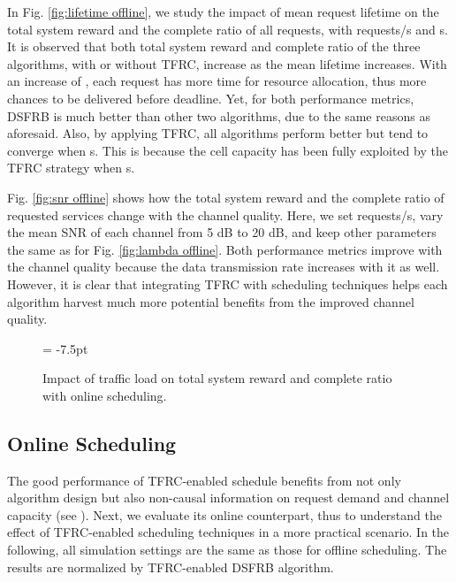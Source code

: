 \documentclass[journal,letterpaper,12pt,oneside,onecolumn,draftclsnofoot]{IEEEtran}
\begin{document}
In Fig. \ref{fig:lifetime offline}, we study the impact of mean request lifetime on the total system reward and the complete ratio of all requests, with  requests/s and  s. It is observed that both total system reward and complete ratio of the three algorithms, with or without TFRC, increase as the mean lifetime  increases. With an increase of , each request has more time for resource allocation, thus more chances to be delivered before deadline.
Yet, for both performance metrics, DSFRB is  much better than other two algorithms, due to the same reasons as aforesaid.
Also, by applying TFRC, all  algorithms perform better but tend to converge when  s. This is because the cell capacity has been fully exploited by the TFRC strategy when  s.





Fig. \ref{fig:snr offline} shows how the total system reward and the complete ratio of requested services change with the channel quality. Here, we set  requests/s, vary the mean SNR of each channel from 5 dB to 20 dB, and keep other parameters the same as for Fig. \ref{fig:lambda offline}. Both performance metrics improve with the channel quality because the data transmission rate increases with it as well. However, it is clear that integrating TFRC with scheduling techniques helps each algorithm harvest much more potential benefits from the improved channel quality.

\vspace{-0.25cm}
\begin{figure*}[htp]
\subfigcapskip = -7.5pt
\centering
{}
\vspace{-0.3cm}
\caption{Impact of traffic load on total system reward and complete ratio with online scheduling.}
\label{fig:lambda online}
\vspace{-0.5cm}
\end{figure*}


\subsection{Online Scheduling}

The good performance of TFRC-enabled schedule benefits from not only algorithm design but also non-causal information on request demand and channel capacity (see \cite{Shan_TWC_submitted}). Next, we evaluate its online counterpart, thus to understand the effect of TFRC-enabled scheduling techniques in a more practical scenario.
In the following, all simulation settings are the same as those for offline scheduling. The results are normalized by TFRC-enabled DSFRB algorithm.
\end{document}
